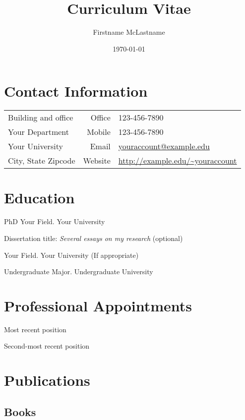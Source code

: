 \documentclass[12pt]{safecv}%
\author{Firstname McLastname}
\title{Curriculum Vitae}
\date{\today}
\begin{document}
\maketitle
\section*{Contact Information}
\begin{tabular}{@{}lrl@{}}
Building and office & Office  & 123-456-7890                         \\
Your Department     & Mobile  & 123-456-7890                         \\
Your University     & Email   & \url{youraccount@example.edu}        \\
City, State Zipcode & Website & \url{http://example.edu/~youraccount} %
\end{tabular}

\section*{Education}
\begin{description}[noitemsep]
\item[year] PhD Your Field. Your University
\item Dissertation title: \textit{Several essays on my research} (optional)
\item[year]  Your Field. Your University (If appropriate)
\item[year]  Undergraduate Major. Undergraduate University
\end{description}

\section*{Professional Appointments}
\begin{description}[noitemsep]
\item[start--end] Most recent position
\item[start--end] Second-most recent position
\end{description}

\section*{Publications}
\subsection*{Books}
\end{document}
